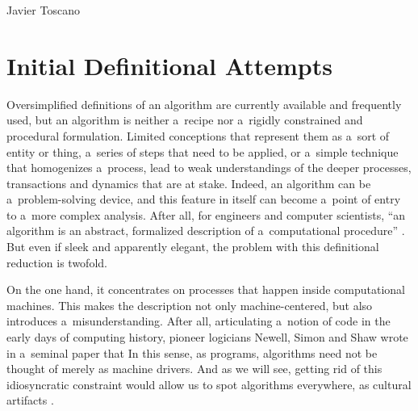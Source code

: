 \begin{artengenv}{Javier Toscano}
\section*{Initial Definitional Attempts}
\lettrine[loversize=0.13,lines=2,lraise=-0.03,nindent=0em,findent=0.2pt]%
{O}{}versimplified definitions of an algorithm are currently available and frequently used, but an algorithm is neither a~recipe nor a~rigidly constrained and procedural formulation. Limited conceptions that represent them as a~sort of entity or thing, a~series of steps that need to be applied, or a~simple technique that homogenizes a~process, lead to weak understandings of the deeper processes, transactions and dynamics that are at stake. Indeed, an algorithm can be a~problem-solving device, and this feature in itself can become a~point of entry to a~more complex analysis. After all, for engineers and computer scientists, ``an algorithm is an abstract, formalized description of a~computational procedure''
\parencite[][p.3]{dourish_algorithms_2016}. %
 But even if sleek and apparently elegant, the problem with this definitional reduction is twofold.

On the one hand, it concentrates on processes that happen inside computational machines. This makes the description not only machine-centered, but also introduces a~misunderstanding. After all, articulating a~notion of code in the early days of computing history, pioneer logicians Newell, Simon and Shaw wrote in a~seminal paper that
 In this sense, as programs, algorithms need not be thought of merely as machine drivers. And as we will see, getting rid of this idiosyncratic constraint would allow us to spot algorithms everywhere, as cultural artifacts 
\parencites[][p.15]{finn_what_2017}[][]{seaver_algorithms_2017}.%



\end{artengenv}
